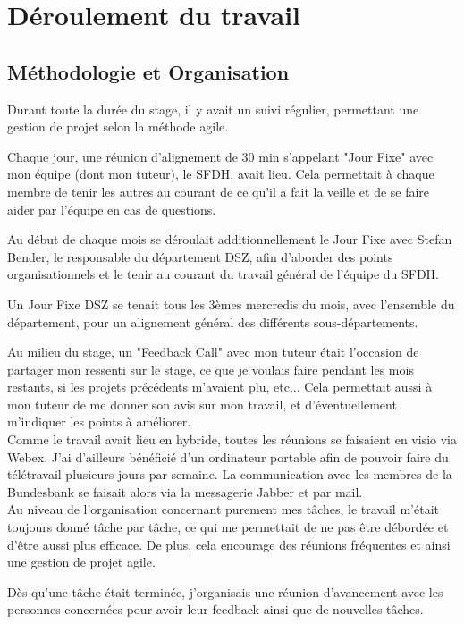 \section{Déroulement du travail}

\subsection{Méthodologie et Organisation}

Durant toute la durée du stage, il y avait un suivi régulier, permettant une gestion de projet selon la méthode agile.

Chaque jour, une réunion d'alignement de 30 min s'appelant "Jour Fixe" avec mon équipe (dont mon tuteur), le SFDH, avait lieu.
Cela permettait à chaque membre de tenir les autres au courant de ce qu'il a fait la veille et de se faire aider par l'équipe en cas de questions.

Au début de chaque mois se déroulait additionnellement le Jour Fixe avec Stefan Bender, le responsable du département DSZ, afin d'aborder des points organisationnels et le tenir au courant du travail général de l'équipe du SFDH.

Un Jour Fixe DSZ se tenait tous les 3èmes mercredis du mois, avec l'ensemble du département, pour un alignement général des différents sous-départements. 

Au milieu du stage, un "Feedback Call" avec mon tuteur était l'occasion de partager mon ressenti sur le stage, ce que je voulais faire pendant les mois restants, si les projets précédents m'avaient plu, etc... 
Cela permettait aussi à mon tuteur de me donner son avis sur mon travail, et d'éventuellement m'indiquer les points à améliorer.
\\

Comme le travail avait lieu en hybride, toutes les réunions se faisaient en visio via Webex.
J'ai d'ailleurs bénéficié d'un ordinateur portable afin de pouvoir faire du télétravail plusieurs jours par semaine.
La communication avec les membres de la Bundesbank se faisait alors via la messagerie Jabber et par mail.
\\

Au niveau de l'organisation concernant purement mes tâches, le travail m'était toujours donné tâche par tâche, ce qui me permettait de ne pas être débordée et d'être aussi plus efficace.
De plus, cela encourage des réunions fréquentes et ainsi une gestion de projet agile.

Dès qu'une tâche était terminée, j'organisais une réunion d'avancement avec les personnes concernées pour avoir leur feedback ainsi que de nouvelles tâches.

